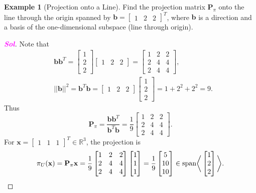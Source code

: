 \documentclass[12pt,openany]{book}
\theoremstyle{definition}
\newtheorem{example}{Example}[chapter]
\newcommand{\R}{\mathbb{R}}
\newcommand{\sol}{\textcolor{magenta}{\bf Sol}}
\newcommand{\norms}[1]{|| #1||}
\renewcommand{\vec}[1]{\textbf{#1}}
\begin{document}
	\vspace{4pt}
	\begin{example}[Projection onto a Line]
		Find the projection matrix \(\textbf{P}_\pi\) onto the line through the origin spanned by \(\vec{b}=\begin{bmatrix}
			1&2&2
		\end{bmatrix}^T\), where \(\vec{b}\) is a direction and a basis of the one-dimensional subspace (line through origin).
		\begin{proof}[\sol]
			Note that
			\begin{align*}
				&\vec{b}\vec{b}^T=\begin{bmatrix}
					1\\2\\2
				\end{bmatrix}\begin{bmatrix}
				1&2&2
			\end{bmatrix}=\begin{bmatrix}
			1&2&2\\2&4&4\\2&4&4
		\end{bmatrix},\\
			&\norms{\vec{b}}^2=\vec{b}^T\vec{b}=\begin{bmatrix}
				1&2&2
			\end{bmatrix}\begin{bmatrix}
				1\\2\\2
			\end{bmatrix}=1+2^2+2^2=9.
			\end{align*} Thus \[
			\textbf{P}_{\pi}=\frac{\vec{b}\vec{b}^T}{\vec{b}^T\vec{b}}=\frac{1}{9}
				\begin{bmatrix}
				1&2&2\\2&4&4\\2&4&4
			\end{bmatrix}.
			\] For \(\textbf{x}=\begin{bmatrix}
				1&1&1
			\end{bmatrix}^T\in \R^3\), the projection is \[
			\pi_U(\vec{x})=\textbf{P}_\pi\vec{x}=\frac{1}{9}\begin{bmatrix}
				1&2&2\\2&4&4\\2&4&4
			\end{bmatrix}\begin{bmatrix}
			1 \\ 1 \\ 1
		\end{bmatrix}=\frac{1}{9}\begin{bmatrix}
		5\\10\\10
		\end{bmatrix}\in\textnormal{span}\bigg\langle\begin{bmatrix}
		1\\2\\2
	\end{bmatrix}\bigg\rangle.
			\]
		\end{proof}
	\end{example}
\end{document}

